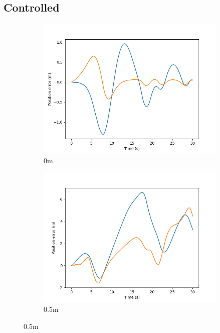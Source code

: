 \documentclass[class=article, crop=false]{standalone}
\begin{document}
\subsection{Controlled}
\begin{figure}
    \centering
    \begin{subfigure}[b]{0.48\textwidth}
        \centering
        \includegraphics{scenario1/rov-0m/0.0m/usv_pos_error_controlled}
        \caption{0m}
        \label{}
    \end{subfigure}
    \hfill
        \begin{subfigure}[b]{0.48\textwidth}
        \centering
        \includegraphics{scenario1/rov-0m/0.5m/usv_pos_error_controlled}
        \caption{0.5m}

\end{subfigure}
\end{figure}
\end{document}
